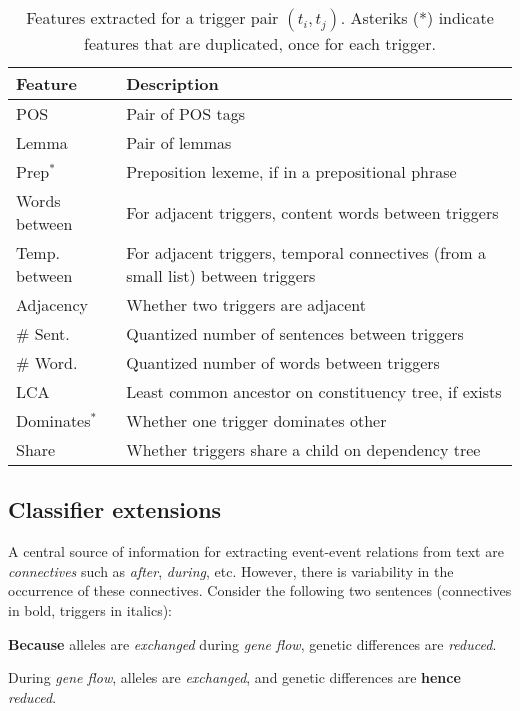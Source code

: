\begin{table}[t]
{\footnotesize
\hfill{}
\begin{tabular}{|p{2.4cm}|p{4.7cm}|}
\hline
\textbf{Feature} &\textbf{Description}\\
\hline
 POS & Pair of POS tags \\
Lemma & Pair of lemmas \\
Prep$^*$ & Preposition lexeme, if in a prepositional phrase \\
Words between  & For adjacent triggers, content words between triggers \\
Temp. between & For adjacent triggers, temporal connectives (from a small list) between triggers \\
Adjacency & Whether two triggers are adjacent \\
\# Sent. & Quantized number of sentences between triggers \\
\# Word. & Quantized number of words between triggers \\
LCA & Least common ancestor on constituency tree, if exists \\
Dominates$^*$ & Whether one trigger dominates other \\
Share & Whether triggers share a child on dependency tree \\
\hline
\end{tabular}}
\hfill{}
\caption{Features extracted for a trigger pair $(t_i,t_j)$. Asteriks (*) indicate features that are duplicated, once for each trigger.}
\label{tab:features}
\end{table}

\subsection{Classifier extensions} \label{subsec:pairwise-novel}

A central source of information for extracting event-event relations from text are \emph{connectives} such as \emph{after}, \emph{during}, etc. However, there is variability in the occurrence of these connectives. Consider the following two sentences (connectives in bold, triggers in italics):

\begin{enumerate}[itemsep=0pt,topsep=0pt] \footnotesize{
\item \textbf{Because} alleles are \emph{exchanged} during \emph{gene flow}, genetic differences are \emph{reduced}. \label{sent:1}
\item During \emph{gene flow}, alleles are \emph{exchanged}, and genetic differences are \textbf{hence} \emph{reduced}. \label{sent:2}}
\end{enumerate}

